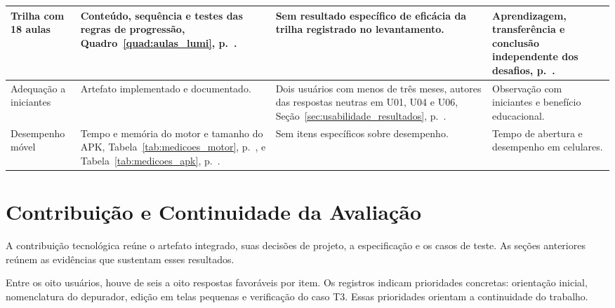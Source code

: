 \begin{landscape}
\begin{quadro}[htb]
\begin{tabular}{|P{2.7cm}|P{6.2cm}|P{5.7cm}|P{7.4cm}|}
\hline
Trilha com 18 aulas & Conteúdo, sequência e testes das regras de progressão, Quadro~\ref{quad:aulas_lumi}, p.~\pageref{quad:aulas_lumi}. & Sem resultado específico de eficácia da trilha registrado no levantamento. & Aprendizagem, transferência e conclusão independente dos desafios, p.~\pageref{sec:ameacas_validade}. \\
\hline
Adequação a iniciantes & Artefato implementado e documentado. & Dois usuários com menos de três meses, autores das respostas neutras em U01, U04 e U06, Seção~\ref{sec:usabilidade_resultados}, p.~\pageref{sec:usabilidade_resultados}. & Observação com iniciantes e benefício educacional. \\
\hline
Desempenho móvel & Tempo e memória do motor e tamanho do APK, Tabela~\ref{tab:medicoes_motor}, p.~\pageref{tab:medicoes_motor}, e Tabela~\ref{tab:medicoes_apk}, p.~\pageref{tab:medicoes_apk}. & Sem itens específicos sobre desempenho. & Tempo de abertura e desempenho em celulares. \\
\hline
\end{tabular}
\vspace{0.2cm}
\end{quadro}
\FloatBarrier
\end{landscape}

\section{Contribuição e Continuidade da Avaliação}
\label{sec:contribuicao_resultados}

A contribuição tecnológica reúne o artefato integrado, suas decisões de projeto,
a especificação e os casos de teste. As seções anteriores reúnem as evidências que sustentam esses resultados.

Entre os oito usuários, houve de seis a oito respostas favoráveis por item.
Os registros indicam prioridades concretas: orientação inicial, nomenclatura do
depurador, edição em telas pequenas e verificação do caso T3. Essas prioridades orientam a continuidade do trabalho.
